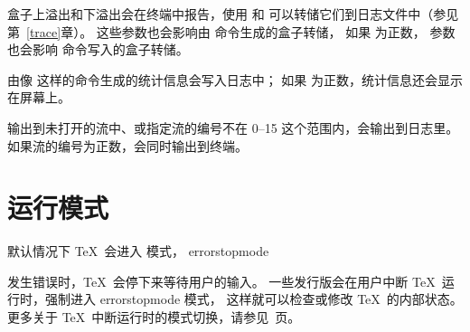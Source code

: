 \documentclass{book}
\begin{document}
盒子上溢出和下溢出会在终端中报告，使用  和
 可以转储它们到日志文件中（参见第~\ref{trace}章）。
这些参数也会影响由  命令生成的盒子转储，
如果  为正数，
参数也会影响  命令写入的盒子转储。

由像  这样的命令生成的统计信息会写入日志中；
如果  为正数，统计信息还会显示在屏幕上。

输出到未打开的流中、或指定流的编号不在 0--15 这个范围内，会输出到日志里。
如果流的编号为正数，会同时输出到终端。


\section{运行模式}

默认情况下 \TeX\ 会进入  模式，
\cstoidx errorstopmode\par
发生错误时，\TeX\ 会停下来等待用户的输入。
一些发行版会在用户中断 \TeX\ 运行时，强制进入 errorstopmode 模式，
这样就可以检查或修改 \TeX\ 的内部状态。
更多关于 \TeX\ 中断运行时的模式切换，请参见~\pageref{interaction}页。
\end{document}
